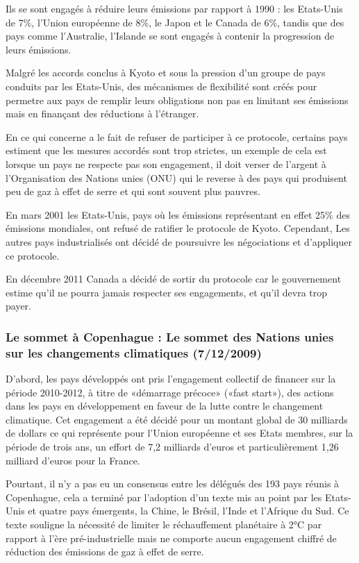 \documentclass[a4paper,11pt]{article}
\begin{document}
Ils  se  sont engagés  à  réduire  leurs émissions  par  rapport  à  1990 :  les
Etats-Unis de  7\%, l’Union  européenne de 8\%,  le Japon  et le Canada  de 6\%,
tandis que des  pays comme l’Australie, l’Islande se sont  engagés à contenir la
progression de leurs émissions.


Malgré  les accords conclus  à Kyoto  et sous  la pression  d'un groupe  de pays
conduits  par les  Etats-Unis, des  mécanismes  de flexibilité  sont créés  pour
permetre aux pays de remplir leurs obligations non pas en limitant ses émissions
mais en finançant des réductions à l'étranger. 


En ce qui concerne  a le fait de refuser de participer  à ce protocole, certains
pays estiment  que les mesures accordés  sont trop strictes, un  exemple de cela
est lorsque un pays ne respecte pas son engagement, il doit verser de l’argent à
l’Organisation des Nations unies (ONU) qui  le reverse à des pays qui produisent
peu de gaz à effet de serre et qui sont souvent plus pauvres.


En mars  2001 les Etats-Unis, pays  où les émissions représentant  en effet 25\%
des   émissions   mondiales,   ont   refusé   de  ratifier   le   protocole   de
Kyoto. Cependant,  Les autres pays  industrialisés ont décidé de  poursuivre les
négociations et d'appliquer ce protocole.


En décembre  2011 Canada  a décidé  de sortir du  protocole car  le gouvernement
estime qu’il  ne pourra  jamais respecter ses  engagements, et qu’il  devra trop
payer.


\subsubsection[Le sommet à Copenhague]{Le sommet à Copenhague : Le sommet des Nations unies sur les changements climatiques (7/12/2009)}

D’abord, les pays développés ont  pris l'engagement collectif de financer sur la
période 2010-2012,  à titre de  «démarrage précoce» («fast start»),  des actions
dans  les pays  en développement  en  faveur de  la lutte  contre le  changement
climatique. Cet engagement a été décidé pour un montant global de 30 milliards
de dollars ce  qui représente pour l'Union européenne et  ses Etats membres, sur
la période de trois ans, un effort de 7,2 milliards d'euros et particulièrement
1,26 milliard d'euros pour la France. 

Pourtant, il n’y a pas eu un  consensus entre les délégués des 193 pays réunis à
Copenhague,  cela a  terminé par  l’adoption  d’un texte  mis au  point par  les
Etats-Unis et quatre pays émergents, la Chine, le Brésil, l'Inde et l'Afrique du
Sud. Ce texte souligne la nécessité de limiter le réchauffement planétaire à 2°C
par rapport à  l’ère pré-industrielle mais ne comporte  aucun engagement chiffré
de réduction des émissions de gaz à effet de serre. 
\end{document}
